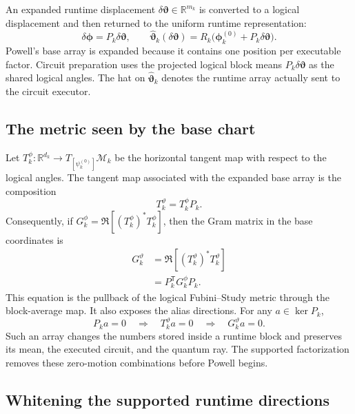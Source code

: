 \documentclass[10pt,twocolumn]{article}
\begin{document}
An expanded runtime displacement
\(\delta\bm\vartheta\in\mathbb R^{m_k}\) is converted to a logical
displacement and then returned to the uniform runtime representation:
\begin{equation}
\delta\bm\phi=P_k\delta\bm\vartheta,
\qquad
\widehat{\bm\vartheta}_k(\delta\bm\vartheta)
=R_k\bigl(\bm\phi_k^{(0)}+P_k\delta\bm\vartheta\bigr).
\label{eq:sr-refit-runtime-map}
\end{equation}
Powell's base array is expanded because it contains one position per
executable factor. Circuit preparation uses the projected logical block means
\(P_k\delta\bm\vartheta\) as the shared logical angles. The
hat on \(\widehat{\bm\vartheta}_k\) denotes the runtime array actually sent to
the circuit executor.

\subsection*{The metric seen by the base chart}

Let \(T_k^{\phi}:\mathbb R^{d_k}\rightarrow
T_{[\psi_k^{(0)}]}\mathcal M_k\) be the horizontal tangent map with respect to
the logical angles. The tangent map associated with the expanded base array is
the composition
\begin{equation}
T_k^{\vartheta}=T_k^{\phi}P_k.
\label{eq:sr-refit-base-tangent}
\end{equation}
Consequently, if \(G_k^{\phi}=\Re[(T_k^{\phi})^*T_k^{\phi}]\), then the Gram
matrix in the base coordinates is
\begin{align}
G_k^{\vartheta}
&=\Re[(T_k^{\vartheta})^*T_k^{\vartheta}]\nonumber\\
&=P_k^{\mathsf T}G_k^{\phi}P_k.
\label{eq:sr-refit-base-gram}
\end{align}
This equation is the pullback of the logical Fubini--Study metric through the
block-average map. It also exposes the alias directions. For any
\(a\in\ker P_k\),
\begin{equation}
P_ka=0
\quad\Longrightarrow\quad
T_k^{\vartheta}a=0
\quad\Longrightarrow\quad
G_k^{\vartheta}a=0.
\label{eq:sr-refit-alias-null}
\end{equation}
Such an array changes the numbers stored inside a runtime block and preserves
its mean, the executed circuit, and the quantum ray. The supported
factorization removes these zero-motion combinations before Powell begins.

\subsection*{Whitening the supported runtime directions}
\end{document}
